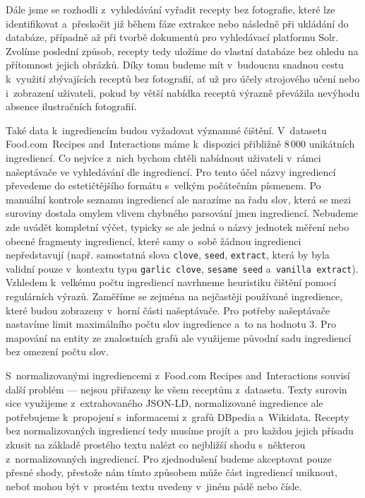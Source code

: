 Dále jsme se rozhodli z~vyhledávání vyřadit recepty bez fotografie, které lze identifikovat a~přeskočit již během fáze extrakce nebo následně při ukládání do databáze, případně až při tvorbě dokumentů pro vyhledávací platformu Solr. Zvolíme poslední způsob, recepty tedy uložíme do vlastní databáze bez ohledu na přítomnost jejich obrázků. Díky tomu budeme mít v~budoucnu snadnou cestu k~využití zbývajících receptů bez fotografií, ať už pro účely strojového učení nebo i~zobrazení uživateli, pokud by větší nabídka receptů výrazně převážila nevýhodu absence ilustračních fotografií.

Také data k~ingrediencím budou vyžadovat významné čištění. V~datasetu Food.com~Recipes and~Interactions máme k~dispozici přibližně $8\,000$ unikátních ingrediencí. Co nejvíce z~nich bychom chtěli nabídnout uživateli v~rámci našeptávače ve vyhledávání dle ingrediencí. Pro tento účel názvy ingrediencí převedeme do estetičtějšího formátu s~velkým počátečním písmenem. Po manuální kontrole seznamu ingrediencí ale narazíme na řadu slov, která se mezi suroviny dostala omylem vlivem chybného parsování jmen ingrediencí. Nebudeme zde uvádět kompletní výčet, typicky se ale jedná o názvy jednotek měření nebo obecné fragmenty ingrediencí, které samy o~sobě žádnou ingredienci nepředstavují (např. samostatná slova \texttt{clove}, \texttt{seed}, \texttt{extract}, která by byla validní pouze v~kontextu typu \texttt{garlic clove}, \texttt{sesame seed} a~\texttt{vanilla extract}). Vzhledem k~velkému počtu ingrediencí navrhneme heuristiku čištění pomocí regulárních výrazů. Zaměříme se zejména na nejčastěji používané ingredience, které budou zobrazeny v~horní části našeptávače. Pro potřeby našeptávače nastavíme limit maximálního počtu slov ingredience a~to na hodnotu $3$. Pro mapování na entity ze znalostních grafů ale využijeme původní sadu ingrediencí bez omezení počtu slov.

S~normalizovanými ingrediencemi z~Food.com Recipes and~Interactions souvisí další problém --- nejsou přiřazeny ke všem receptům z~datasetu. Texty surovin sice využijeme z~extrahovaného JSON-LD, normalizované ingredience ale potřebujeme k~propojení s~informacemi z~grafů DBpedia a~Wikidata. Recepty bez normalizovaných ingrediencí tedy musíme projít a~pro každou jejich přísadu zkusit na základě prostého textu nalézt co nejbližší shodu s~některou z~normalizovaných ingrediencí. Pro zjednodušení budeme akceptovat pouze přesné shody, přestože nám tímto způsobem může část ingrediencí uniknout, neboť mohou být v~prostém textu uvedeny v~jiném pádě nebo čísle.

